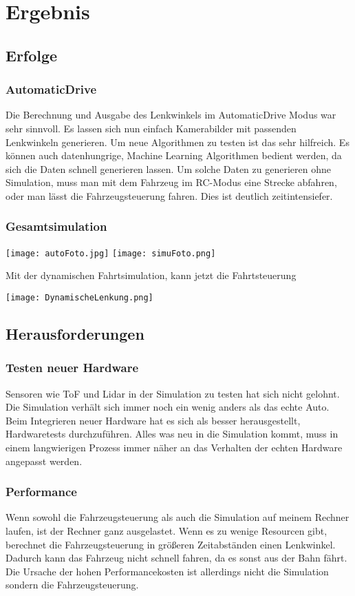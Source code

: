 
\chapter{Ergebnis}


\section{Erfolge}

\subsection*{AutomaticDrive}
Die Berechnung und Ausgabe des Lenkwinkels im AutomaticDrive Modus war sehr sinnvoll.
Es lassen sich nun einfach Kamerabilder mit passenden Lenkwinkeln generieren.
Um neue Algorithmen zu testen ist das sehr hilfreich.
Es können auch datenhungrige, Machine Learning Algorithmen bedient werden, da sich die Daten schnell generieren lassen.
Um solche Daten zu generieren ohne Simulation, muss man mit dem Fahrzeug im RC-Modus eine Strecke abfahren, oder man lässt die Fahrzeugsteuerung fahren.
Dies ist deutlich zeitintensiefer.   
\subsection*{Gesamtsimulation}
\begin{center}
    \texttt{[image: autoFoto.jpg]}
    \texttt{[image: simuFoto.png]}
\end{center}
Mit der dynamischen Fahrtsimulation, kann jetzt die Fahrtsteuerung

\begin{center}
    \texttt{[image: DynamischeLenkung.png]}
\end{center}


\section{Herausforderungen}
\subsection*{Testen neuer Hardware}
Sensoren wie ToF und Lidar in der Simulation zu testen hat sich nicht gelohnt. 
Die Simulation verhält sich immer noch ein wenig anders als das echte Auto.
Beim Integrieren neuer Hardware hat es sich als besser herausgestellt, Hardwaretests durchzuführen.
Alles was neu in die Simulation kommt, muss in einem langwierigen Prozess immer näher an das Verhalten der echten Hardware angepasst werden.  
\subsection*{Performance}
Wenn sowohl die Fahrzeugsteuerung als auch die Simulation auf meinem Rechner laufen, ist der Rechner ganz ausgelastet.
Wenn es zu wenige Resourcen gibt, berechnet die Fahrzeugsteuerung in größeren Zeitabständen einen Lenkwinkel.
Dadurch kann das Fahrzeug nicht schnell fahren, da es sonst aus der Bahn fährt.
Die Ursache der hohen Performancekosten ist allerdings nicht die Simulation sondern die Fahrzeugsteuerung.
